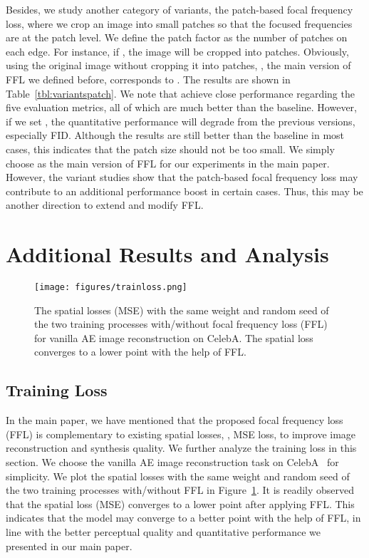 \documentclass[10pt,twocolumn,letterpaper]{article}
\begin{document}
Besides, we study another category of variants, the patch-based focal frequency loss, where we crop an image into small patches so that the focused frequencies are at the patch level.
We define the patch factor  as the number of patches on each edge. For instance, if , the image will be cropped into  patches. Obviously, using the original image without cropping it into patches, \ie, the main version of FFL we defined before, corresponds to .
The results are shown in Table~\ref{tbl:variantspatch}.
We note that  achieve close performance regarding the five evaluation metrics, all of which are much better than the baseline.
However, if we set , the quantitative performance will degrade from the previous versions, especially FID. Although the results are still better than the baseline in most cases, this indicates that the patch size should not be too small.
We simply choose  as the main version of FFL for our experiments in the main paper.
However, the variant studies show that the patch-based focal frequency loss may contribute to an additional performance boost in certain cases.
Thus, this may be another direction to extend and modify FFL.



\section{Additional Results and Analysis}
\label{sec:analysis}


\begin{figure}[t]
	\centering
\texttt{[image: figures/trainloss.png]}
\caption{The spatial losses (MSE) with the same weight and random seed of the two training processes with/without focal frequency loss (FFL) for vanilla AE image reconstruction on CelebA. The spatial loss converges to a lower point with the help of FFL.}
	\label{fig:trainloss}
	\vspace{-0.2cm}
\end{figure}


\subsection{Training Loss}
\label{sec:trainingloss}
In the main paper, we have mentioned that the proposed focal frequency loss (FFL) is complementary to existing spatial losses, \eg, MSE loss, to improve image reconstruction and synthesis quality.
We further analyze the training loss in this section. We choose the vanilla AE image reconstruction task on CelebA~\cite{celeba} for simplicity.
We plot the spatial losses with the same weight and random seed of the two training processes with/without FFL in Figure~\ref{fig:trainloss}.
It is readily observed that the spatial loss (MSE) converges to a lower point after applying FFL.
This indicates that the model may converge to a better point with the help of FFL, in line with the better perceptual quality and quantitative performance we presented in our main paper. 
\end{document}
